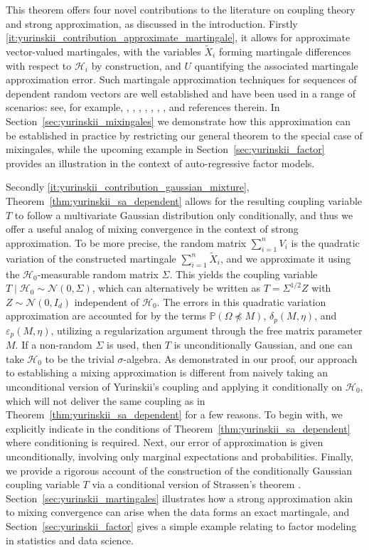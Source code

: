 \documentclass[11pt,lof]{puthesis}
\renewcommand{\P}{\ensuremath{\mathbb{P}}}
\newcommand{\cH}{\ensuremath{\mathcal{H}}}
\newcommand{\cN}{\ensuremath{\mathcal{N}}}
\theoremstyle{break}
\theoremstyle{proof}
\begin{document}
This theorem offers four novel contributions to the literature on coupling
theory and strong approximation, as discussed in the introduction.
Firstly \ref{it:yurinskii_contribution_approximate_martingale}, it allows for
approximate
vector-valued martingales, with the variables $\tilde X_i$ forming martingale
differences with respect to $\cH_i$ by construction, and $U$ quantifying the
associated martingale approximation error. Such martingale approximation
techniques for sequences of dependent random vectors are well established and
have been used in a range of scenarios: see, for example,
\citet{wu2004martingale}, \citet{dedecker2007weak}, \citet{zhao2008martingale},
\citet{peligrad2010conditional}, \citet{atchade2014martingale},
\citet{cuny2014martingale}, \citet{magda2018martingale}, and references
therein. In Section~\ref{sec:yurinskii_mixingales} we demonstrate how this
approximation
can be established in practice by restricting our general theorem to the
special case of mixingales, while the upcoming example in
Section~\ref{sec:yurinskii_factor} provides an illustration in the context of
auto-regressive factor models.

Secondly \ref{it:yurinskii_contribution_gaussian_mixture},
Theorem~\ref{thm:yurinskii_sa_dependent} allows for the
resulting coupling variable $T$
to follow a multivariate Gaussian distribution only conditionally,
and thus we offer a useful analog of mixing convergence in the context
of strong approximation.
To be more precise, the random matrix $\sum_{i=1}^{n} V_i$
is the quadratic variation of the constructed martingale
$\sum_{i=1}^n \tilde X_i$, and we approximate it using the $\cH_0$-measurable
random matrix $\Sigma$. This yields the coupling variable
$T \mid \cH_0 \sim \cN(0, \Sigma)$, which can alternatively be written as
$T=\Sigma^{1/2} Z$ with $Z \sim \cN(0,I_d)$ independent of $\cH_0$.
The errors in this quadratic variation
approximation are accounted for by the terms
$\P(\Omega \npreceq M)$, $\delta_p(M, \eta)$, and $\varepsilon_p(M, \eta)$,
utilizing a regularization argument through the free matrix parameter $M$.
If a non-random $\Sigma$ is used, then $T$ is unconditionally Gaussian,
and one can take $\cH_0$ to be the trivial $\sigma$-algebra.
As demonstrated in our proof, our approach to establishing a
mixing approximation is different from naively taking an unconditional version
of Yurinskii's coupling and applying
it conditionally on $\cH_0$, which will not deliver the same coupling as in
Theorem~\ref{thm:yurinskii_sa_dependent} for a few reasons.
To begin with, we explicitly indicate in the
conditions of Theorem~\ref{thm:yurinskii_sa_dependent} where conditioning is
required.
Next, our error of approximation is given unconditionally,
involving only marginal expectations and probabilities.
Finally, we provide a rigorous account of the construction of the
conditionally Gaussian coupling variable $T$ via a conditional version
of Strassen's theorem \citep{chen2020jackknife}.
Section~\ref{sec:yurinskii_martingales}
illustrates how a strong approximation akin to
mixing convergence can arise when the data
forms an exact martingale, and Section~\ref{sec:yurinskii_factor} gives a
simple example
relating to factor modeling in statistics and data science.
\end{document}
